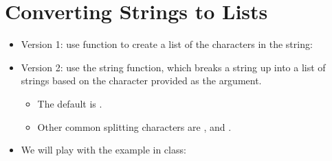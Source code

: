 \documentclass[letterpaper,10pt,english]{sphinxmanual}
\begin{document}
\section{Converting Strings to Lists}
\label{\detokenize{lecture_notes/lec10_lists2:converting-strings-to-lists}}\begin{itemize}
\item {} 
Version 1: use function  to create a list of the
characters in the string:

\begin{sphinxVerbatim}[commandchars=\\\{\}]
  
  
\end{sphinxVerbatim}

\item {} 
Version 2:  use the string  function, which breaks a string up into a
list of strings based on the character provided as the argument.
\begin{itemize}
\item {} 
The default is .

\item {} 
Other common splitting characters are ,  and
.

\end{itemize}

\item {} 
We will play with the  example in class:


\end{itemize}
\end{document}
